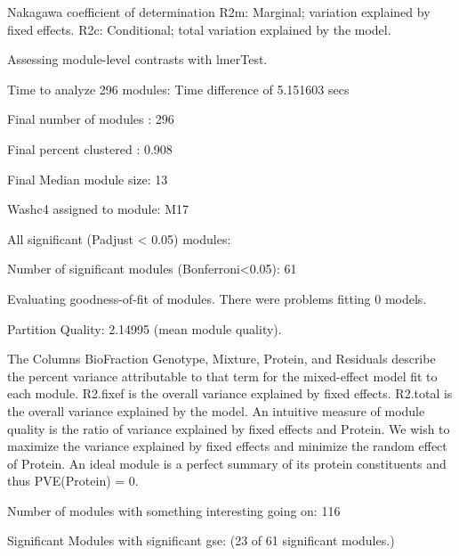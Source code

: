 \documentclass[11pt]{elife}\usepackage[]{graphicx}\usepackage[]{color}
\begin{document}
Nakagawa coefficient of determination
R2m: Marginal; variation explained by fixed effects.
R2c: Conditional; total variation explained by the model.





Assessing module-level contrasts with lmerTest.

Time to analyze 296 modules:
Time difference of 5.151603 secs

Final number of modules : 296

Final percent clustered : 0.908

Final Median module size: 13

Washc4 assigned to module: M17

All significant (Padjust < 0.05) modules:

Number of significant modules (Bonferroni<0.05): 61

Evaluating goodness-of-fit of modules.
There were problems fitting 0 models.

Partition Quality: 2.14995 (mean module quality).

The Columns BioFraction Genotype, Mixture, Protein, and Residuals describe the
percent variance attributable to that term for the mixed-effect model fit to
each module. R2.fixef is the overall variance explained by fixed effects.
R2.total is the overall variance explained by the model.
An intuitive measure of module quality is the ratio of variance explained by
fixed effects and Protein. We wish to maximize the variance explained by fixed
effects and minimize the random effect of Protein. An ideal module is a perfect
summary of its protein constituents and thus PVE(Protein) = 0. 


Number of modules with something interesting going on: 116

Significant Modules with significant gse:
(23 of 61 significant modules.)


\end{document}
